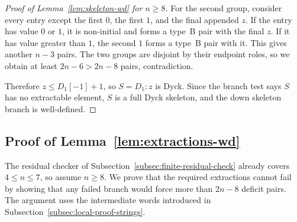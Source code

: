 \documentclass[11pt]{article}
\theoremstyle{plain}
\theoremstyle{definition}
\theoremstyle{remark}
\begin{document}
\begin{proof}[Proof of Lemma~\ref{lem:skeleton-wd} for \(n\ge 8\)]
For the second group, consider every entry except the first \(0\), the first
\(1\), and the final appended \(z\).  If the entry has value \(0\) or \(1\), it
is non-initial and forms a type~B pair with the final \(z\).  If it has value
greater than \(1\), the second \(1\) forms a type~B pair with it.  This gives
another \(n-3\) pairs.  The two groups are disjoint by their endpoint roles, so
we obtain at least \(2n-6>2n-8\) pairs, contradiction.

Therefore \(z\le D_1[-1]+1\), so \(S=D_1:z\) is Dyck.  Since the branch test
says \(S\) has no extractable element, \(S\) is a full Dyck skeleton, and the
down skeleton branch is well-defined.
\end{proof}
\subsection{Proof of Lemma~\ref{lem:extractions-wd}}
\label{subsec:proof-extractions-wd}
The residual checker of Subsection~\ref{subsec:finite-residual-check} already
covers \(4\le n\le 7\), so assume \(n\ge 8\).  We prove that the required
extractions cannot fail by showing that any failed branch would force more
than \(2n-8\) deficit pairs.  The argument uses the intermediate words
introduced in Subsection~\ref{subsec:local-proof-strings}.
\end{document}
